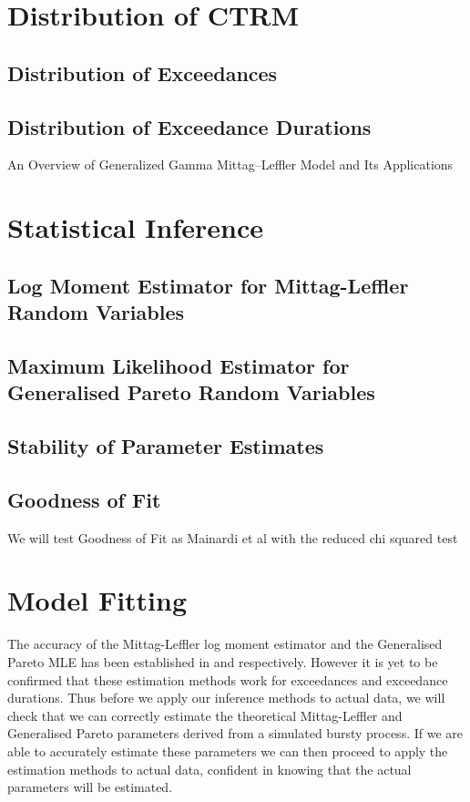 \documentclass[honours,12pt]{UNSWthesis}
\newcommand{\1}{\mathbf 1}
\numberwithin{equation}{section}
\theoremstyle{definition}
\theoremstyle{remark}
\begin{document}
\chapter{Distribution of CTRM}\label{dist}
\section{Distribution of Exceedances}
\section{Distribution of Exceedance Durations}
An Overview of Generalized Gamma Mittag–Leffler Model and
Its Applications 

\chapter{Statistical Inference}
\section{Log Moment Estimator for Mittag-Leffler Random Variables}
\section{Maximum Likelihood Estimator for Generalised Pareto Random Variables}
\section{Stability of Parameter Estimates}
\section{Goodness of Fit}%
We will test Goodness of Fit as Mainardi et al with the reduced chi squared test
\chapter{Model Fitting}
The accuracy of the Mittag-Leffler log moment estimator and the Generalised Pareto MLE has been established in \cite{Cahoy2013} and \cite{GPaccuracyCitation} respectively. However it is yet to be confirmed that these estimation methods work for exceedances and exceedance durations. Thus before we apply our inference methods to actual data, we will check that we can correctly estimate the theoretical Mittag-Leffler and Generalised Pareto parameters derived from a simulated bursty process. If we are able to accurately estimate these parameters we can then proceed to apply the estimation methods to actual data, confident in knowing that the actual parameters will be estimated.
\end{document}
